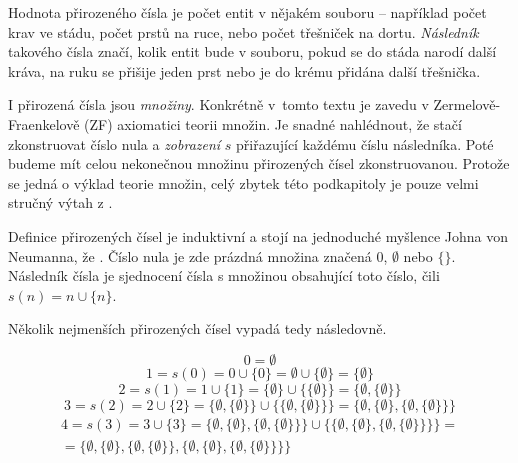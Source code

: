 Hodnota přirozeného čísla je počet entit v nějakém souboru -- například počet krav ve stádu, počet prstů na ruce, nebo počet třešniček na dortu. \textit{Následník} takového čísla značí, kolik entit bude v souboru, pokud se do stáda narodí další kráva, na ruku se přišije jeden prst nebo je do krému přidána další třešnička.

I přirozená čísla jsou \textit{množiny}. Konkrétně v~tomto textu je zavedu v Zermelově-Fraenkelově (ZF) axiomatici teorii množin. Je snadné nahlédnout, že stačí zkonstruovat číslo nula a \textit{zobrazení} $s$ přiřazující každému číslu následníka. Poté budeme mít celou nekonečnou množinu přirozených čísel zkonstruovanou. Protože se jedná o výklad teorie množin, celý zbytek této podkapitoly je pouze velmi stručný výtah z \cite{TeMno}.

Definice přirozených čísel je induktivní a stojí na jednoduché myšlence Johna von Neumanna, že . Číslo nula je zde prázdná množina značená $0$, $\emptyset$ nebo $\{ \}$. Následník čísla je sjednocení čísla s množinou obsahující toto číslo, čili $s(n) = n \cup \{n\}$.

Několik nejmenších přirozených čísel vypadá tedy následovně.
\begin{example}
\begin{equation}
0 = \emptyset
\end{equation}
\begin{equation}
1 = s(0) = 0 \cup \{ 0 \} = \emptyset \cup \{ \emptyset \} = \{ \emptyset \}
\end{equation}
\begin{equation}
2 = s(1)= 1 \cup \{ 1 \} = \{ \emptyset \} \cup \{ \{ \emptyset \} \} = \{ \emptyset , \{ \emptyset \} \}
\end{equation}
\begin{equation}
3 = s(2)= 2 \cup \{ 2 \} = \{ \emptyset , \{ \emptyset \} \} \cup \{ \{ \emptyset , \{ \emptyset \} \} \} = \{ \emptyset , \{ \emptyset \} , \{ \emptyset , \{ \emptyset \} \} \} 
\end{equation}
\begin{equation}
\begin{split}
4 =s(3)= 3 \cup \{ 3 \} = \{ \emptyset , \{ \emptyset \} , \{ \emptyset , \{ \emptyset \} \} \}  \cup \{ \{ \emptyset , \{ \emptyset \} , \{ \emptyset , \{ \emptyset \} \} \}  \} = \\ = \{ \emptyset , \{ \emptyset \} , \{ \emptyset , \{ \emptyset \} \} , \{ \emptyset , \{ \emptyset \} , \{ \emptyset , \{ \emptyset \} \} \}  \}
\end{split}
\end{equation}
\end{example}

